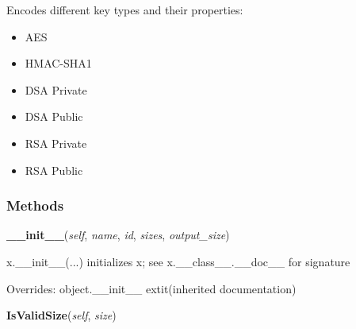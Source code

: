 Encodes different key types and their properties:

\begin{itemize}
\setlength{\parskip}{0.6ex}
  \item AES

  \item HMAC-SHA1

  \item DSA Private

  \item DSA Public

  \item RSA Private

  \item RSA Public

\end{itemize}



  \subsubsection{Methods}

    \vspace{0.5ex}

\hspace{.8\funcindent}\begin{boxedminipage}{\funcwidth}

    \raggedright \textbf{\_\_init\_\_}(\textit{self}, \textit{name}, \textit{id}, \textit{sizes}, \textit{output\_size})

\setlength{\parskip}{2ex}
    x.\_\_init\_\_(...) initializes x; see x.\_\_class\_\_.\_\_doc\_\_ for 
    signature

\setlength{\parskip}{1ex}
      Overrides: object.\_\_init\_\_ 	extit{(inherited documentation)}

    \end{boxedminipage}

    \label{keyczar:keyinfo:KeyType:IsValidSize}

    \vspace{0.5ex}

\hspace{.8\funcindent}\begin{boxedminipage}{\funcwidth}

    \raggedright \textbf{IsValidSize}(\textit{self}, \textit{size})

\setlength{\parskip}{2ex}
\setlength{\parskip}{1ex}
    \end{boxedminipage}


